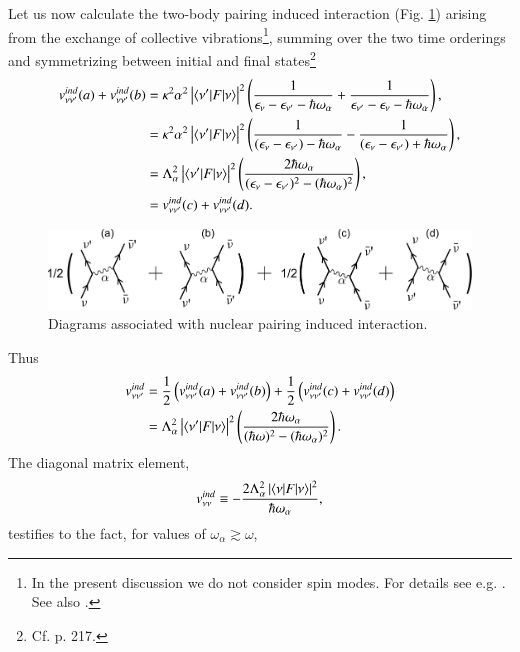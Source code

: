 Let us now calculate the two-body pairing induced interaction (Fig. \ref{fig3.A.2}) arising from the exchange of collective vibrations\footnote{In the present discussion we do not consider spin modes. For details see e.g. \cite{Idini:15}. See also \cite{Bortignon:83}.},  summing over the two time orderings and symmetrizing between initial and final states\footnote{Cf. \cite{Brink:05} p. 217.}
\begin{align}
\nonumber v_{\nu\nu'}^{ind}(a)+v_{\nu\nu'}^{ind}(b)&=\kappa^2\alpha^2\left|\langle {\nu'|F|\nu} \rangle\right|^2\left(\frac{1}{\epsilon_\nu-\epsilon_{\nu'}-\hbar\omega_\alpha}+\frac{1}{\epsilon_{\nu'}-\epsilon_{\nu}-\hbar\omega_\alpha}\right),\\
\nonumber &=\kappa^2\alpha^2\left|\langle {\nu'|F|\nu} \rangle\right|^2\left(\frac{1}{(\epsilon_\nu-\epsilon_{\nu'})-\hbar\omega_\alpha}-\frac{1}{(\epsilon_{\nu}-\epsilon_{\nu'})+\hbar\omega_\alpha}\right),\\
\nonumber &=\Lambda_\alpha^2\left|\langle {\nu'|F|\nu} \rangle\right|^2\left(\frac{2\hbar\omega_\alpha}{(\epsilon_\nu-\epsilon_{\nu'})^2-(\hbar\omega_\alpha)^2}\right),\\
&=v_{\nu\nu'}^{ind}(c)+v_{\nu\nu'}^{ind}(d).
\end{align}
   \begin{figure}
   \centerline{\includegraphics*[width=12cm,angle=0	]{nutshell/figs/fig3_A_2}}
   \caption{Diagrams associated with nuclear pairing induced interaction.}\label{fig3.A.2}
   \end{figure}
Thus
\begin{align}\label{eq3.A.17}
\nonumber v_{\nu\nu'}^{ind}&=\frac{1}{2}\left(v_{\nu\nu'}^{ind}(a)+v_{\nu\nu'}^{ind}(b)\right)+\frac{1}{2}\left(v_{\nu\nu'}^{ind}(c)+v_{\nu\nu'}^{ind}(d)\right)\\ &=\Lambda_\alpha^2\left|\langle {\nu'|F|\nu} \rangle\right|^2\left(\frac{2\hbar\omega_\alpha}{(\hbar\omega)^2-(\hbar\omega_\alpha)^2}\right).
\end{align}
The diagonal matrix element,
\begin{align}
\nonumber v_{\nu\nu}^{ind}\equiv-\frac{2\Lambda_\alpha^2\left|\langle {\nu|F|\nu} \rangle\right|^2}{\hbar\omega_\alpha},
\end{align}
testifies to the fact, for values of $\omega_\alpha\gtrsim\omega$, 
